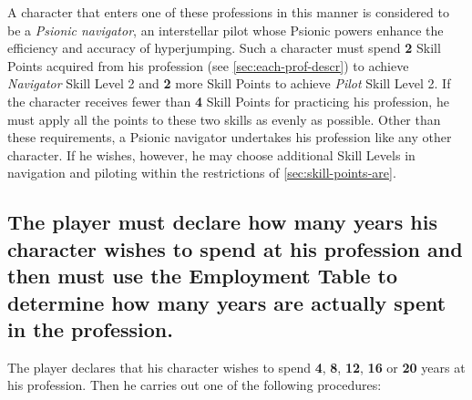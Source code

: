 A character that enters one of these professions in this manner is
considered to be a \emph{Psionic navigator}, an interstellar pilot
whose Psionic powers enhance the efficiency and accuracy of
hyperjumping. Such a character must spend \textbf{2} Skill Points
acquired from his profession (see \ref{sec:each-prof-descr}) to
achieve \emph{Navigator} Skill Level 2 and \textbf{2} more Skill
Points to achieve \emph{Pilot} Skill Level 2. If the character
receives fewer than \textbf{4} Skill Points for practicing his
profession, he must apply all the points to these two skills as evenly
as possible. Other than these requirements, a Psionic navigator
undertakes his profession like any other character. If he wishes,
however, he may choose additional Skill Levels in navigation and
piloting within the restrictions of \ref{sec:skill-points-are}.


\subsection[Years In Profession]{The player must declare how many
  years his character 
  wishes to spend at his profession and then must use the Employment
  Table to determine how many years are actually spent in the
  profession.}
\label{sec:player-must-declare}

The player declares that his character wishes to spend \textbf{4},
\textbf{8}, \textbf{12}, \textbf{16} or \textbf{20} years at his
profession. Then he carries out one of the following procedures:

